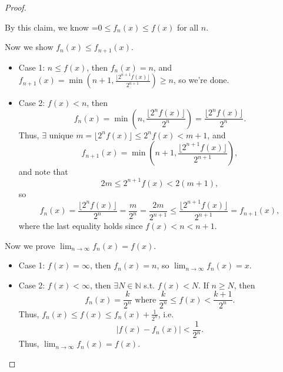\begin{proof}
\begin{explanation}
    \end{explanation}   

    By this claim, we know =\(0 \le f_n(x) \le f(x)\) for all \(n\).

    Now we show \(f_n(x) \le f_{n+1}(x)\). 
    \begin{itemize}
        \item Case 1: \(n \le f(x)\), then \(f_n(x) = n\), and \(f_{n+1}(x) = \min \left( n+1, \frac{\lfloor 2^{n+1} f(x) \rfloor}{2^{n+1}} \right) \ge n\), so we're done. 
        \item Case 2: \(f(x) < n\), then 
        \[
            f_n(x) = \min \left( n, \frac{\lfloor 2^n f(x) \rfloor}{2^n} \right) = \frac{\lfloor 2^n f(x) \rfloor}{2^n}. 
        \]
        Thus, \(\exists \) unique \(m = \lfloor 2^n f(x) \rfloor \le 2^n f(x) < m + 1\), and 
        \[
            f_{n+1}(x) = \min \left( n+1, \frac{\lfloor 2^{n+1} f(x) \rfloor}{2^{n+1}} \right), 
        \]  
        and note that 
        \[
            2m \le 2^{n+1}f(x) < 2(m + 1),
        \]
        so 
        \[
            f_n(x) = \frac{\lfloor 2^n f(x) \rfloor}{2^n} = \frac{m}{2^n} = \frac{2m}{2^{n+1}} \le \frac{\lfloor 2^{n+1} f(x) \rfloor}{2^{n+1}} = f_{n+1}(x),
        \]
        where the last equality holds since \(f(x) < n < n + 1\). 
    \end{itemize} 
    
    Now we prove \(\lim_{n \to \infty} f_n(x) = f(x) \). 
    \begin{itemize}
        \item Case 1: \(f(x) = \infty\), then \(f_n(x) = n\), so \(\lim_{n \to \infty} f_n(x) = x \). 
        \item Case 2: \(f(x) < \infty\), then \(\exists N \in \mathbb{N}\) s.t. \(f(x) < N\). If \(n \ge N\), then 
        \[
            f_n(x) = \frac{k}{2^n} \text{ where } \frac{k}{2^n} \le f(x) < \frac{k+1}{2^n}.
        \]        
        Thus, \(f_n(x) \le f(x) \le f_n(x) + \frac{1}{2^n}\), i.e. 
        \[
            \vert f(x) - f_n(x) \vert < \frac{1}{2^n}.
        \] 
        Thus, \(\lim_{n \to \infty} f_n(x) = f(x)  \). 
    \end{itemize}
\end{proof}
